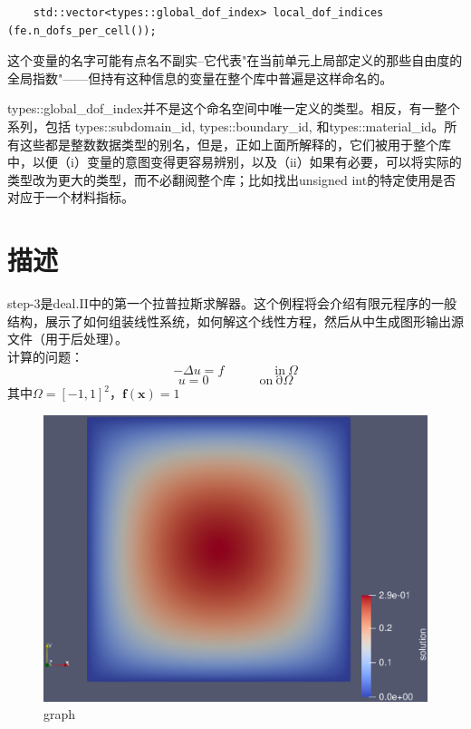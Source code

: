 \documentclass[nofonts]{ctexart} %
\begin{document}
\begin{lstlisting}
    std::vector<types::global_dof_index> local_dof_indices (fe.n_dofs_per_cell());
\end{lstlisting}
这个变量的名字可能有点名不副实--它代表"在当前单元上局部定义的那些自由度的全局指数"——但持有这种信息的变量在整个库中普遍是这样命名的。

    types::global\_dof\_index并不是这个命名空间中唯一定义的类型。相反，有一整个系列，包括 types::subdomain\_id, types::boundary\_id, 和types::material\_id。所有这些都是整数数据类型的别名，但是，正如上面所解释的，它们被用于整个库中，以便（i）变量的意图变得更容易辨别，以及（ii）如果有必要，可以将实际的类型改为更大的类型，而不必翻阅整个库；比如找出unsigned int的特定使用是否对应于一个材料指标。
\section{描述}
step-3是deal.II中的第一个拉普拉斯求解器。这个例程将会介绍有限元程序的一般结构，展示了如何组装线性系统，如何解这个线性方程，然后从中生成图形输出源文件（用于后处理）。\\
计算的问题：
\begin{equation}
 -\Delta u=f\quad\quad\quad\quad\mathrm{in~}\Omega
\end{equation}
\begin{equation}
 u=0\quad\quad\quad\quad\mathrm{on~\partial}\Omega
\end{equation}
其中$\Omega=[-1,1]^2，\textbf{f}(\textbf{x})=1$
\begin{figure}[htbp]
      \centering
      \includegraphics[scale=0.5]{./solution.eps}
      \caption{graph}
  \end{figure}
\end{document}
